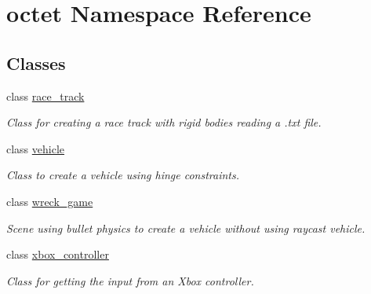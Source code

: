 \hypertarget{namespaceoctet}{\section{octet Namespace Reference}
\label{namespaceoctet}
}
\subsection*{Classes}
\begin{DoxyCompactItemize}
\item 
class \hyperlink{classoctet_1_1race__track}{race\+\_\+track}
\begin{DoxyCompactList}\small\item\em Class for creating a race track with rigid bodies reading a .txt file. \end{DoxyCompactList}\item 
class \hyperlink{classoctet_1_1vehicle}{vehicle}
\begin{DoxyCompactList}\small\item\em Class to create a vehicle using hinge constraints. \end{DoxyCompactList}\item 
class \hyperlink{classoctet_1_1wreck__game}{wreck\+\_\+game}
\begin{DoxyCompactList}\small\item\em Scene using bullet physics to create a vehicle without using raycast vehicle. \end{DoxyCompactList}\item 
class \hyperlink{classoctet_1_1xbox__controller}{xbox\+\_\+controller}
\begin{DoxyCompactList}\small\item\em Class for getting the input from an Xbox controller. \end{DoxyCompactList}\end{DoxyCompactItemize}
